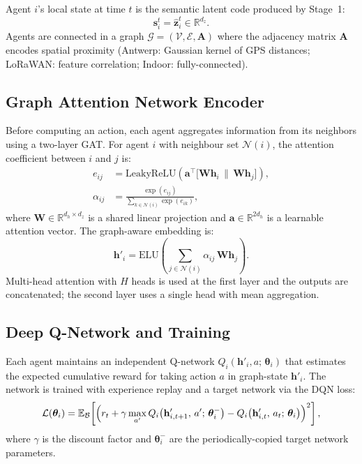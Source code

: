 \documentclass[12pt,a4paper]{article}
\begin{document}
Agent $i$'s local state at time $t$ is the semantic latent code produced
by Stage~1:
\begin{equation}
\mathbf{s}_i^t = \hat{\mathbf{z}}_i^t \in \mathbb{R}^{d_z}.
\label{eq:state_madrl}
\end{equation}
Agents are connected in a graph $\mathcal{G}=(\mathcal{V},\mathcal{E},\mathbf{A})$
where the adjacency matrix $\mathbf{A}$ encodes spatial proximity
(Antwerp: Gaussian kernel of GPS distances; LoRaWAN: feature correlation;
Indoor: fully-connected).

\subsection{Graph Attention Network Encoder}

Before computing an action, each agent aggregates information from its
neighbors using a two-layer GAT. For agent $i$ with neighbour set
$\mathcal{N}(i)$, the attention coefficient between $i$ and $j$ is:
\begin{align}
e_{ij} &= \mathrm{LeakyReLU}\!\left(
  \mathbf{a}^\top\!\bigl[\mathbf{W}\mathbf{h}_i \,\|\, \mathbf{W}\mathbf{h}_j\bigr]
\right), \label{eq:gat_e}\\
\alpha_{ij} &= \frac{\exp(e_{ij})}{\displaystyle\sum_{k\in\mathcal{N}(i)}\exp(e_{ik})},
\label{eq:gat_alpha}
\end{align}
where $\mathbf{W}\in\mathbb{R}^{d_h\times d_z}$ is a shared linear
projection and $\mathbf{a}\in\mathbb{R}^{2d_h}$ is a learnable attention
vector. The graph-aware embedding is:
\begin{equation}
\mathbf{h}'_i = \mathrm{ELU}\!\left(
  \sum_{j\in\mathcal{N}(i)}\alpha_{ij}\,\mathbf{W}\mathbf{h}_j
\right).
\label{eq:gat_h}
\end{equation}
Multi-head attention with $H$ heads is used at the first layer and the
outputs are concatenated; the second layer uses a single head with mean
aggregation.

\subsection{Deep Q-Network and Training}

Each agent maintains an independent Q-network $Q_i(\mathbf{h}'_i, a;\,\bm{\theta}_i)$
that estimates the expected cumulative reward for taking action $a$ in
graph-state $\mathbf{h}'_i$. The network is trained with experience
replay and a target network via the DQN loss:
\begin{equation}
\mathcal{L}(\bm{\theta}_i) =
\mathbb{E}_{\mathcal{B}}\!\left[
  \Bigl(
    r_t + \gamma\max_{a'}Q_i\!\left(\mathbf{h}'_{i,t+1},\,a';\,\bm{\theta}_i^-\right)
    - Q_i\!\left(\mathbf{h}'_{i,t},\,a_t;\,\bm{\theta}_i\right)
  \Bigr)^2
\right],
\label{eq:dqn}
\end{equation}
where $\gamma$ is the discount factor and $\bm{\theta}_i^-$ are the
periodically-copied target network parameters.
\end{document}
